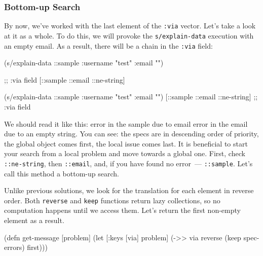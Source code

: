 \fi

\subsubsection{Bottom-up Search}

By now, we've worked with the last element of the \verb|:via| vector. Let's take a look at it as a whole. To do this, we will provoke the \verb|s/explain-data| execution with an empty email. As a result, there will be a chain in the \verb|:via| field:

\ifx\DEVICETYPE\MOBILE

\begin{english}
  \begin{clojure}
(s/explain-data ::sample
  {:username "test" :email ""})

;; :via field
[::sample ::email ::ne-string]
  \end{clojure}
\end{english}

\else

\begin{english}
  \begin{clojure}
(s/explain-data ::sample {:username "test" :email ""})
[::sample ::email ::ne-string] ;; :via field
  \end{clojure}
\end{english}

\fi

We should read it like this: error in the sample due to email \arr{} error in the email due to an empty string. You can see: the specs are in descending order of priority, the global object comes first, the local issue comes last. It is beneficial to start your search from a local problem and move towards a global one. First, check \verb|::ne-string|, then \verb|::email|, and, if you have found no error~--- \verb|::sample|.  Let's call this method a bottom-up search.


Unlike previous solutions, we look for the translation for each element in reverse order. Both \verb|reverse| and \verb|keep| functions return lazy collections, so no computation happens until we access them. Let's return the first non-empty element as a result.

\begin{english}
  \begin{clojure}
(defn get-message
  [problem]
  (let [{:keys [via]} problem]
    (->> via
         reverse
         (keep spec-errors)
         first)))
  \end{clojure}
\end{english}

